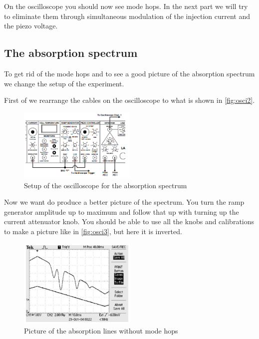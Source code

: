 On the oscilloscope you should now see mode hops.
In the next part we will try to eliminate them through simultaneous modulation of the injection current and the piezo voltage.

\subsection{The absorption spectrum}
\label{ssec:exe3}

To get rid of the mode hops and to see a good picture of the absorption spectrum we change the setup of the experiment. 

First of we rearrange the cables on the oscilloscope to what is shown in \autoref{fig:osci2}.

\begin{figure}
    \centering
    \includegraphics[width=0.5\textwidth]{images/generator2.png}
    \caption{Setup of the oscilloscope for the absorption spectrum \cite{V60}}
    \label{fig:osci2}
\end{figure}

Now we want do produce a better picture of the spectrum. 
You turn the ramp generator amplitude up to maximum and follow that up with turning up the current attenuator knob.
You should be able to use all the knobs and calibrations to make a picture like in \autoref{fig:osci3}, but here it is inverted.

\begin{figure}
    \centering
    \includegraphics[width=0.5\textwidth]{images/oszi.png}
    \caption{Picture of the absorption lines without mode hops \cite{V60}}
    \label{fig:osci3}
\end{figure}

